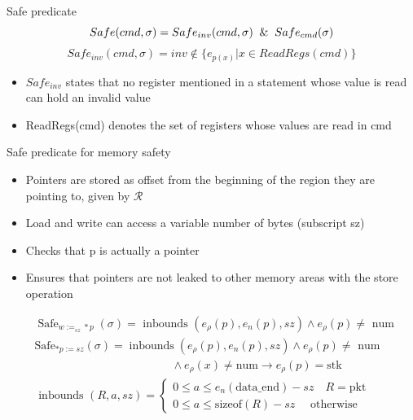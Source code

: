 \documentclass[aspectratio=169]{beamer}
\begin{document}
\begin{frame}{Safe predicate}
  $$ Safe(cmd, \sigma ) = Safe_{inv} (cmd, \sigma ) \And Safe_{cmd} (\sigma) $$
  $$Safe_{inv}(cmd, \sigma) = inv \notin \{ {e_{p(x)} | x \in ReadRegs(cmd)\}}$$
  \begin{itemize}
    \item $Safe_{inv}$ states that no register mentioned
          in a statement whose value is read can hold an invalid value
    \item ReadRegs(cmd) denotes the set of registers whose
          values are read in cmd
  \end{itemize}
\end{frame}

\begin{frame}{Safe predicate for memory safety}
  \begin{itemize}
    \item Pointers are stored as offset from the beginning of the region they are pointing to, given by $\mathcal{R}$
    \item Load and write can access a variable number of bytes (subscript sz)
    \item Checks that p is actually a pointer
    \item Ensures that pointers are not leaked to other memory areas with the store operation

  \end{itemize}

  $$
    \begin{aligned}     &
                   \operatorname{Safe}_{w:=_{s z} * p}(\sigma)=\text { inbounds }\left(e_\rho(p), e_n(p), s z\right) \wedge e_\rho(p) \neq \text { num }                                                                                     \\ &
                   \mathrm{Safe}_{* p:=s z}(\sigma)=\operatorname{inbounds}\left(e_\rho(p), e_n(p), s z\right) \wedge e_\rho(p) \neq \text { num }                                                                                           \\ &
                   \qquad \qquad \qquad \qquad \qquad \qquad \wedge e_\rho(x) \neq \mathrm{num} \rightarrow e_\rho(p)=\mathrm{stk}                                                                                                           \\ &
                   \text { inbounds }(R, a, s z)= \left\{\begin{array}{l}0 \leq a \leq e_{n} (\text{data\_end})-sz \quad R=\mathrm{pkt} \\ 0 \leq a \leq \text {sizeof}(R)-sz \quad \text { otherwise }\end{array}\right. \\ &
    \end{aligned}
  $$
\end{frame}
\end{document}
